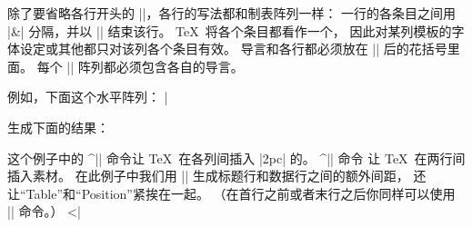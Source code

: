 \li 除了要省略各行开头的 |\+|，各行的写法都和制表阵列一样：
一行的各条目之间用 |&| 分隔，并以 |\cr| 结束该行。
\TeX\ 将各个条目都看作一个，
因此对某列模板的字体设定或其他都只对该列各个条目有效。
\endulist
\noindent 导言和各行都必须放在 |\halign| 后的花括号里面。
每个 |\halign| 阵列都必须包含各自的导言。

例如，下面这个水平阵列：
\csdisplay
\tabskip=2pc
|

\noindent 生成下面的结果：

%
\noindent 这个例子中的 ^|\tabskip| \ctsref{\tabskip}
命令让 \TeX\ 在各列间插入 |2pc| 的。
^|\noalign| \ctsref{\noalign} 命令%
让 \TeX\ 在两行间插入素材。
在此例子中我们用 |\noalign| 生成标题行和数据行之间的额外间距，
还让“Table”和“Position”紧挨在一起。%
（在首行之前或者末行之后你同样可以使用 |\noalign| 命令。）
\eix^^|\halign|


